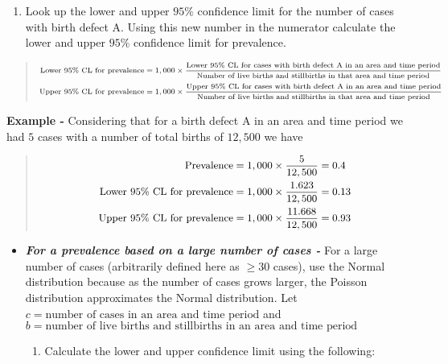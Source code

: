 \documentclass[
]{krantz}
\providecommand{\tightlist}{%
  \setlength{\itemsep}{0pt}\setlength{\parskip}{0pt}}
\begin{document}
\begin{enumerate}
\def\labelenumi{\arabic{enumi}.}
\setcounter{enumi}{1}
\tightlist
\item
  Look up the lower and upper \(95\%\) confidence limit for the number of cases with birth defect A. Using this new number in the numerator calculate the lower and upper \(95\%\) confidence limit for prevalence.
\end{enumerate}

\begin{quote}
\[
\scriptsize
\begin{aligned}
\text{Lower } 95\% \text{ CL for prevalence} &= 1,000 \times \dfrac{\text{Lower } 95\% \text{ CL for cases with birth defect A in an area and time period}}{\text{Number of live births and stillbirths in that area and time period}}\\
\text{Upper } 95\% \text{ CL for prevalence} &= 1,000 \times \dfrac{\text{Upper } 95\% \text{ CL for cases with birth defect A in an area and time period}}{\text{Number of live births and stillbirths in that area and time period}} 
\end{aligned}
\]
\end{quote}

\textbf{Example -} Considering that for a birth defect A in an area and time period we had \(5\) cases with a number of total births of \(12,500\) we have

\begin{quote}
\[
\small
\begin{aligned}
\text{Prevalence} &= 1,000 \times \dfrac{5}{12,500} = 0.4  \\
\text{Lower } 95\% \text{ CL for prevalence} &= 1,000 \times \dfrac{1.623}{12,500} = 0.13  \\
\text{Upper } 95\% \text{ CL for prevalence} &= 1,000 \times \dfrac{11.668}{12,500} = 0.93 
\end{aligned}
\]
\end{quote}

\begin{itemize}
\item
  \textbf{\emph{For a prevalence based on a large number of cases -}} For a large number of cases (arbitrarily defined here as \(\ge 30\) cases), use the Normal distribution because as the number of cases grows larger, the Poisson distribution approximates the Normal distribution.
  Let \(c=\text{number of cases in an area and time period}\) and \(b=\text{number of live births and stillbirths in an area and time period}\)

  \begin{enumerate}
  \def\labelenumi{\arabic{enumi}.}
  \tightlist
  \item
    Calculate the lower and upper confidence limit using the following:
  \end{enumerate}
\end{itemize}
\end{document}
